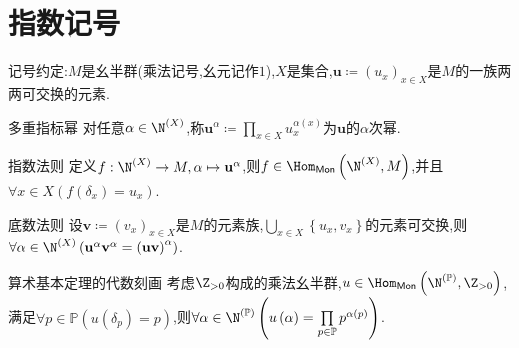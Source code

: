 \section{指数记号}

记号约定:$M$是幺半群(乘法记号,幺元记作$1$),$X$是集合,$\mathbf{u}\coloneq\left(u_{x}\right)_{x\in X}$是$M$的一族两两可交换的元素.

\begin{definition}{多重指标幂}{}
	对任意$\alpha\in\N^{\left(X\right)}$,称$\mathbf{u}^{\alpha}\coloneq\prod\limits_{x\in X}u_{x}^{\alpha\left(x\right)}$为$\mathbf{u}$的$\alpha$次幂.
\end{definition}

\begin{proposition}{指数法则}{}
	定义$f:\N^{\left(X\right)}\to M,\alpha\mapsto\mathbf{u}^{\alpha}$,则$f\in\Hom_{\mathsf{Mon}}\left(\N^{\left(X\right)},M\right)$,并且$\forall x\in X\left(f\left(\delta_{x}\right)=u_{x}\right)$.
\end{proposition}

\begin{proposition}{底数法则}{}
	设$\mathbf{v}\coloneq\left(v_{x}\right)_{x\in X}$是$M$的元素族,$\bigcup\limits_{x\in X}\left\{u_{x},v_{x}\right\}$的元素可交换,则$\forall\alpha\in\N^{\left(X\right)}\left(\mathbf{u}^{\alpha}\mathbf{v}^{\alpha}=\left(\mathbf{u}\mathbf{v}\right)^{\alpha}\right)$.
\end{proposition}

\begin{example}{算术基本定理的代数刻画}{}
	考虑$\Z_{>0}$构成的乘法幺半群,$u\in\Hom_{\mathsf{Mon}}\left(\N^{\left(\mathbb{P}\right)},\Z_{>0}\right)$,满足$\forall p\in\mathbb{P}\left(u\left(\delta_{p}\right)=p\right)$,则$\forall\alpha\in\N^{\left(\mathbb{P}\right)}\left(u\left(\alpha\right)=\prod\limits_{p\in\mathbb{P}}p^{\alpha\left(p\right)}\right)$.
\end{example}

